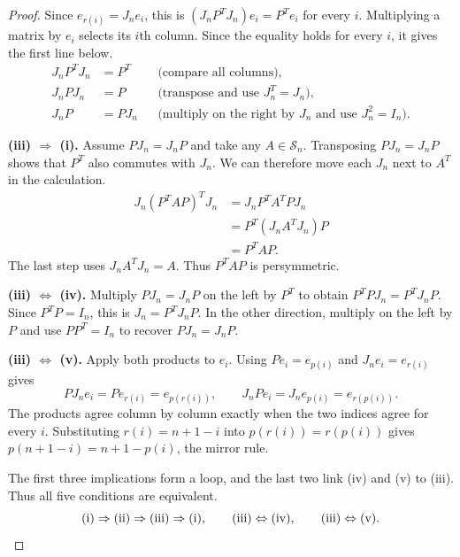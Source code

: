\documentclass[11pt,a4paper]{article}
\begin{document}
\begin{proof}
Since $e_{r(i)}=J_n e_i$, this is $(J_n P^TJ_n)e_i=P^Te_i$ for every $i$.
Multiplying a matrix by $e_i$ selects its $i$th column. Since the
equality holds for every $i$, it gives the first line below.
\begin{align*}
 J_n P^TJ_n &= P^T && \text{(compare all columns)},\\
 J_n PJ_n &= P && \text{(transpose and use $J_n^T=J_n$)},\\
 J_n P &= PJ_n && \text{(multiply on the right by $J_n$ and use $J_n^2=I_n$)}.
\end{align*}

\textbf{(iii) $\Rightarrow$ (i).}
Assume $PJ_n=J_n P$ and take any $A\in\mathcal S_n$.
Transposing $PJ_n=J_n P$ shows that $P^T$ also commutes with $J_n$.
We can therefore move each $J_n$ next to $A^T$ in the calculation.
\begin{align*}
 J_n(P^TAP)^TJ_n
 &=J_n P^T A^T PJ_n\\
 &=P^T(J_n A^TJ_n)P\\
 &=P^TAP.
\end{align*}
The last step uses $J_n A^TJ_n=A$. Thus $P^TAP$ is persymmetric.

\textbf{(iii) $\Leftrightarrow$ (iv).}
Multiply $PJ_n=J_n P$ on the left by $P^T$ to obtain
$P^TPJ_n=P^TJ_n P$. Since $P^TP=I_n$, this is $J_n=P^TJ_n P$.
In the other direction, multiply on the left by $P$ and use
$PP^T=I_n$ to recover $PJ_n=J_n P$.

\textbf{(iii) $\Leftrightarrow$ (v).}
Apply both products to $e_i$. Using $Pe_i=e_{p(i)}$ and $J_n e_i=e_{r(i)}$
gives
\[
 PJ_n e_i=P e_{r(i)}=e_{p(r(i))},
 \qquad
 J_n P e_i=J_n e_{p(i)}=e_{r(p(i))}.
\]
The products agree column by column exactly when the two indices agree
for every $i$. Substituting $r(i)=n+1-i$ into $p(r(i))=r(p(i))$
gives $p(n+1-i)=n+1-p(i)$, the mirror rule.

The first three implications form a loop, and the last two link (iv)
and (v) to (iii). Thus all five conditions are equivalent.
\[
 \text{(i)}\Rightarrow\text{(ii)}\Rightarrow\text{(iii)}\Rightarrow\text{(i)},
 \qquad
 \text{(iii)}\Leftrightarrow\text{(iv)},
 \qquad
 \text{(iii)}\Leftrightarrow\text{(v)}.\qedhere
\]
\end{proof}

\newpage
\end{document}

